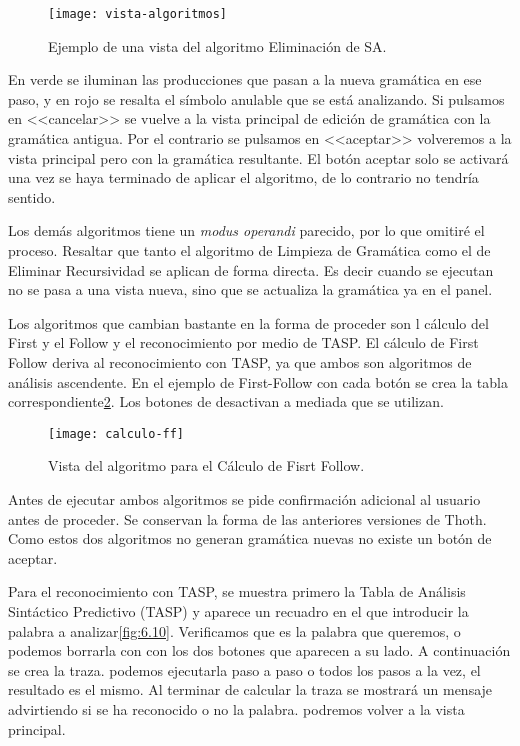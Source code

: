 \begin{figure}[h]
\centering
\texttt{[image: vista-algoritmos]}
\caption{Ejemplo de una vista del algoritmo Eliminación de SA.}
\label{fig:6.8}
\end{figure}

En verde se iluminan las producciones que pasan a la nueva gramática en ese paso, y en rojo se resalta el símbolo anulable que se está analizando. Si pulsamos en <<cancelar>> se vuelve a la vista principal de edición de gramática con la gramática antigua. Por el contrario se pulsamos en <<aceptar>> volveremos a la vista principal pero con la gramática resultante. El botón aceptar solo se activará una vez se haya terminado de aplicar el algoritmo, de lo contrario no tendría sentido. 

Los demás algoritmos tiene un \emph{modus operandi} parecido, por lo que omitiré el proceso. Resaltar que tanto el algoritmo de Limpieza de Gramática como el de Eliminar Recursividad se aplican de forma directa. Es decir cuando se ejecutan no se pasa a una vista nueva, sino que se actualiza la gramática ya en el panel.

Los algoritmos que cambian bastante en la forma de proceder son l cálculo del First y el Follow y el reconocimiento por medio de TASP. El cálculo de First Follow deriva al reconocimiento con TASP, ya que ambos son algoritmos de análisis ascendente. En el ejemplo de First-Follow con cada botón se crea la tabla correspondiente\ref{fig:6.9}. Los botones de desactivan a mediada que se utilizan.

\begin{figure}[h]
\centering
\texttt{[image: calculo-ff]}
\caption{Vista del algoritmo para el Cálculo de Fisrt Follow.}
\label{fig:6.9}
\end{figure}

Antes de ejecutar ambos algoritmos se pide confirmación adicional al usuario antes de proceder. Se conservan la forma de las anteriores versiones de Thoth. Como estos dos algoritmos no generan gramática nuevas no existe un botón de aceptar.

Para el reconocimiento con TASP, se muestra primero la Tabla de Análisis Sintáctico Predictivo (TASP) y aparece un recuadro en el que introducir la palabra a analizar\ref{fig:6.10}. Verificamos que es la palabra que queremos, o podemos borrarla con con los dos botones que aparecen a su lado. A continuación se crea la traza. podemos ejecutarla paso a paso o todos los pasos a la vez, el resultado es el mismo. Al terminar de calcular la traza se mostrará un mensaje advirtiendo si se ha reconocido o no la palabra. podremos volver a la vista principal.


